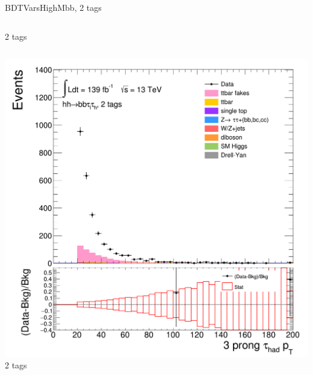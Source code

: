 \begin{frame}{BDTVarsHighMbb, 2 tags}
\begin{columns}[c]
    2 tags
  \end{columns}
  \begin{columns}[c]
    \centering\includegraphics[width=\textwidth]{C_2tag2pjet_0ptv_TauPt3P}\\
    2 tags
  \end{columns}
\end{frame}

